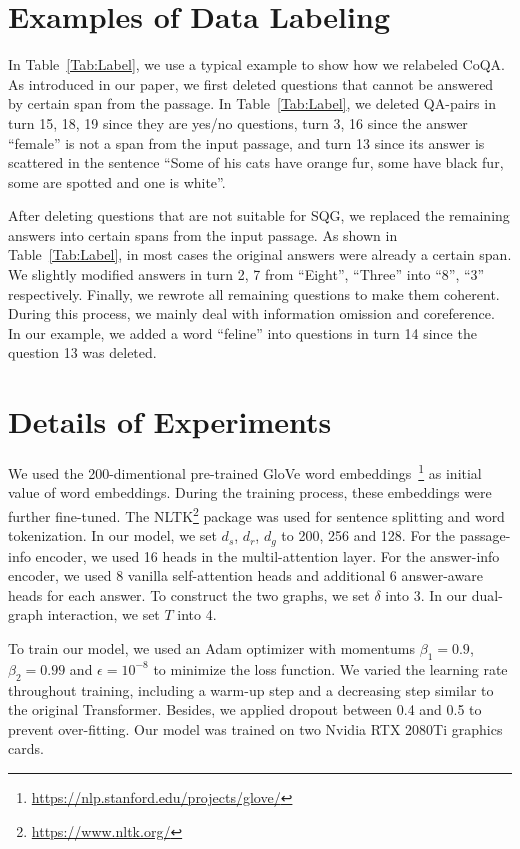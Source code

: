 \documentclass[11pt,a4paper]{article}
\begin{document}



\clearpage
\appendix

\section{Examples of Data Labeling}
In Table~\ref{Tab:Label}, we use a typical example to show how we relabeled CoQA. As introduced in our paper, we first deleted questions that cannot be answered by certain span from the passage. In Table~\ref{Tab:Label}, we deleted QA-pairs in turn 15, 18, 19 since they are yes/no questions, turn 3, 16 since the answer ``female'' is not a span from the input passage, and turn 13 since its answer is scattered in the sentence ``Some of his cats have orange fur, some have black fur, some are spotted and one is white''.

After deleting questions that are not suitable for SQG, we replaced the remaining answers into certain spans from the input passage. As shown in Table~\ref{Tab:Label}, in most cases the original answers were already a certain span. We slightly modified answers in turn 2, 7 from ``Eight'', ``Three'' into ``8'', ``3'' respectively. Finally, we rewrote all remaining questions to make them coherent. During this process, we mainly deal with information omission and coreference. In our example, we added a word ``feline'' into questions in turn 14 since the question 13 was deleted.


\section{Details of Experiments}
We used the 200-dimentional pre-trained GloVe word embeddings~\footnote{\url{https://nlp.stanford.edu/projects/glove/}} as initial value of word embeddings. During the training process, these embeddings were further fine-tuned. The NLTK\footnote{\url{https://www.nltk.org/}} package was used for sentence splitting and word tokenization. In our model, we set $d_s$, $d_r$, $d_g$ to 200, 256 and 128. For the passage-info encoder, we used 16 heads in the multil-attention layer. For the answer-info encoder, we used 8 vanilla self-attention heads and additional 6 answer-aware heads for each answer. To construct the two graphs, we set $\delta$ into 3. In our dual-graph interaction, we set $T$ into 4. 

To train our model, we used an Adam optimizer with momentums $\beta_1 = 0.9$, $\beta_2 = 0.99$ and $\epsilon = 10^{-8}$ to minimize the loss function. We varied the learning rate throughout training, including a warm-up step and a decreasing step similar to the original Transformer. Besides, we applied dropout between 0.4 and 0.5 to prevent over-fitting. Our model was trained on two Nvidia RTX 2080Ti graphics cards.
\end{document}
